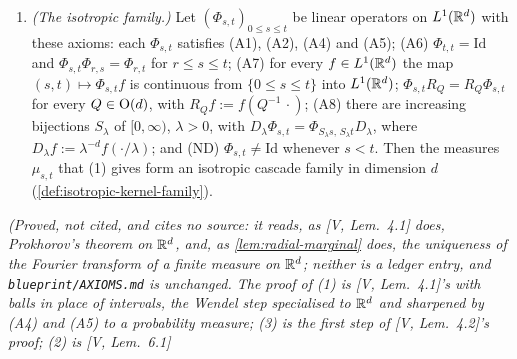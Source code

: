 \begin{lemma}
\begin{enumerate}
dimension $d$ and $(\Phi_{\Sigma,\Sigma'})_{(\Sigma,\Sigma') \in P_W}$ a $(G, W)$-cascade family of
operators (\ref{def:gw-cascade-family}(1)). Then the measures $\mu_{\Sigma,\Sigma'}$ that (1) gives,
$\Phi_{\Sigma,\Sigma'}f = \mu_{\Sigma,\Sigma'} * f$, form a $(G, W)$-cascade family of kernels
(\ref{def:gw-cascade-family}(2)). In particular, let $(\Phi_{\Sigma,\Sigma'})$ be linear
operators on $L^1(\RR^d)$, indexed by the pairs $\Sigma \le \Sigma'$ in $\PSD(d)$, with the axioms
of the case $(\GL(d), \text{Loewner})$: each $\Phi_{\Sigma,\Sigma'}$ satisfies (A1), (A2),
(A4) and (A5); (A6) $\Phi_{\Sigma,\Sigma} = \mathrm{Id}$ and
$\Phi_{\Sigma',\Sigma''}\Phi_{\Sigma,\Sigma'} = \Phi_{\Sigma,\Sigma''}$ whenever
$\Sigma \le \Sigma' \le \Sigma''$; (A7) for every $f \in L^1(\RR^d)$ the map
$(\Sigma,\Sigma') \mapsto \Phi_{\Sigma,\Sigma'}f$ is continuous from the set of pairs into
$L^1(\RR^d)$; $D_A\Phi_{\Sigma,\Sigma'}D_A^{-1} = \Phi_{A\Sigma A^{\tp},\,A\Sigma'A^{\tp}}$ for
every $A \in \GL(d)$ and every pair; and $\Phi_{0,I} \ne \mathrm{Id}$. Then the measures form an
affine cascade family in dimension $d$ (\ref{def:affine-cascade-family}).
\item \emph{(The isotropic family.)} Let $(\Phi_{s,t})_{0 \le s \le t}$ be linear operators on
$L^1(\RR^d)$ with these axioms: each $\Phi_{s,t}$ satisfies (A1),
(A2), (A4) and (A5); (A6) $\Phi_{t,t} = \mathrm{Id}$ and $\Phi_{s,t}\Phi_{r,s} = \Phi_{r,t}$ for
$r \le s \le t$; (A7) for every $f \in L^1(\RR^d)$ the map $(s,t) \mapsto \Phi_{s,t}f$ is
continuous from $\{0 \le s \le t\}$ into $L^1(\RR^d)$; $\Phi_{s,t}R_Q = R_Q\Phi_{s,t}$ for every
$Q \in \mathrm{O}(d)$, with $R_Qf := f(Q^{-1}\,\cdot)$; (A8) there are increasing bijections
$S_\lambda$ of $[0,\infty)$, $\lambda > 0$, with
$D_\lambda\Phi_{s,t} = \Phi_{S_\lambda s,\,S_\lambda t}D_\lambda$, where
$D_\lambda f := \lambda^{-d}f(\cdot/\lambda)$; and (ND) $\Phi_{s,t} \ne \mathrm{Id}$ whenever
$s < t$. Then the measures $\mu_{s,t}$ that (1) gives form an isotropic cascade family in
dimension $d$ (\ref{def:isotropic-kernel-family}).
\end{enumerate}
\statusT\quad\emph{(Proved, not cited, and cites no source: it reads, as [V, Lem.~4.1] does,
Prokhorov's theorem on $\mathbb{R}^d$, and, as \ref{lem:radial-marginal} does, the uniqueness of the
Fourier transform of a finite measure on $\mathbb{R}^d$; neither is a ledger entry, and
\texttt{blueprint/AXIOMS.md} is unchanged. The proof of (1) is [V, Lem.~4.1]'s with balls in
place of intervals, the Wendel step specialised to $\mathbb{R}^d$ and sharpened by (A4) and (A5) to a
probability measure; (3) is the first step of [V, Lem.~4.2]'s proof; (2) is [V, Lem.~6.1]
}
\end{lemma}

